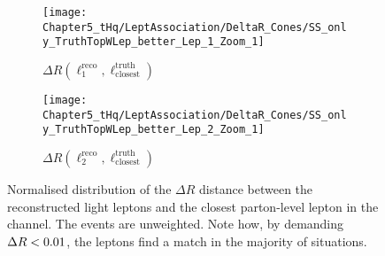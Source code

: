 \begin{figure}[ht]
    \centering
    \begin{subfigure}[b]{0.495\textwidth}
        \centering
        \texttt{[image: Chapter5\_tHq/LeptAssociation/DeltaR\_Cones/SS\_only\_TruthTopWLep\_better\_Lep\_1\_Zoom\_1]}
        \caption{$\Delta R(\ell_{1}^{\text{reco}}, \ell_{\text{closest}}^{\text{truth}})$}
    \end{subfigure}
    \hfill %
    \begin{subfigure}[b]{0.495\textwidth}
        \centering
        \texttt{[image: Chapter5\_tHq/LeptAssociation/DeltaR\_Cones/SS\_only\_TruthTopWLep\_better\_Lep\_2\_Zoom\_1]}
        \caption{$\Delta R(\ell_{2}^{\text{reco}}, \ell_{\text{closest}}^{\text{truth}})$}
    \end{subfigure}   
    \caption{Normalised distribution of the $\Delta R$ distance between the reconstructed light leptons and the 
    closest parton-level lepton in the \dilepSStau channel. The events are unweighted. 
    Note how, by demanding $\Delta R < 0.01$,    the leptons find a match in the majority of situations.}
    \label{fig:chap:tH:LepAssign:DeltaR}
\end{figure}



